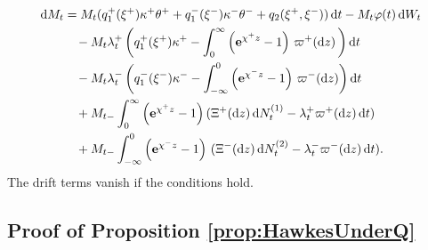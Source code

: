 \documentclass[11pt,a4paper]{article}
\numberwithin{equation}{section}
\theoremstyle{remark}
\theoremstyle{definition}
\newcommand{\e}{{\bf e}}
\newcommand{\dd}{{\rm d}}
\begin{document}
\begin{align*}
    \dd M_t &= M_t (
            q_1^+(\xi^+) \kappa^+\theta^+ +
            q_1^-(\xi^-)
            \kappa^-\theta^- + q_2(\xi^+,\xi^-))\, \dd
            t %
            - M_t \varphi(t)\, \dd W_t\\ %
    &\phantom{=\,}- M_t\lambda_t^+ \left(q_1^+(\xi^+) \kappa^+ -
            \int_0^\infty
            \left(\e^{\chi^+ z} - 1\right)\, \varpi^+(\dd z)\,\right) \dd t \\
    &\phantom{=\,} - M_t \lambda_t^- \left(q_1^-(\xi^-) \kappa^- -
             \int_{-\infty}^0  \left(\e^{\chi^- z} - 1\right)\, \varpi^-(\dd
            z)\right) \dd t \\
    &\phantom{=\,} + M_{t-} \int_0^\infty  \left(\e^{\chi^+ z} - 1\right) (\Xi^+(\dd z)\, \dd N_t^{(1)} - \lambda_t^+
            \varpi^+(\dd z)\, \dd t)\\ %
    &\phantom{=\,} + M_{t-} \int_{-\infty}^0 \left(\e^{\chi^- z} - 1\right)\, (\Xi^-(\dd
            z)\, \dd N_t^{(2)} - \lambda_t^-\varpi^-(\dd z)\, \dd t).
\end{align*}
The drift terms vanish if the conditions hold.

\subsection{Proof of Proposition \ref{prop:HawkesUnderQ}}\label{proof:HawkesUnderQ}
\end{document}
